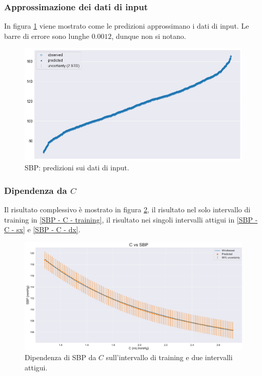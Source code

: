 \vspace{-0.5cm}

\subsubsection{Approssimazione dei dati di input}
In figura \ref{SBP - inference} viene mostrato come le predizioni approssimano i dati di input. Le barre di errore sono lunghe $0.0012$, dunque non si notano.

\begin{figure}[h]
    \centering
    \includegraphics[width=1\textwidth]{images/Training (risultati)/SBP/SBP - inference.png}
    \caption{SBP: predizioni sui dati di input.}
    \label{SBP - inference}
\end{figure}



\subsubsection{Dipendenza da $C$}
Il risultato complessivo è mostrato in figura \ref{SBP - C - full}, il risultato nel solo intervallo di training in \ref{SBP - C - training}, il risultato nei singoli intervalli attigui in \ref{SBP - C - sx} e \ref{SBP - C - dx}.

\vspace{1cm}

\begin{figure}[!htb]
    \centering
    \includegraphics[width=1\textwidth]{images/Training (risultati)/SBP/SBP - C - full.pdf}
    \caption{Dipendenza di SBP da $C$ sull'intervallo di training e due intervalli attigui.}
    \label{SBP - C - full}
\end{figure}

